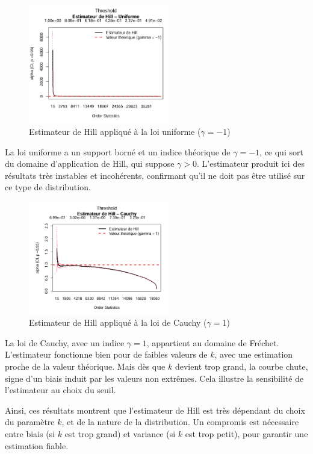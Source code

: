 \documentclass{article}
\theoremstyle{plain}
\theoremstyle{definition}
\theoremstyle{plain}
\begin{document}
\begin{figure}[H]
    \centering
    \includegraphics[width=0.55\textwidth]{./image_hill_pickands/uniforme_hill.png}
    \caption{Estimateur de Hill appliqué à la loi uniforme ($\gamma = -1$)}
\end{figure}
La loi uniforme a un support borné et un indice théorique de \(\gamma = -1\), ce qui sort du domaine d’application de Hill, qui suppose \(\gamma > 0\). L’estimateur produit ici des résultats très instables et incohérents, confirmant qu’il ne doit pas être utilisé sur ce type de distribution.

\begin{figure}[H]
    \centering
    \includegraphics[width=0.55\textwidth]{./image_hill_pickands/cauchy_hill.png}
    \caption{Estimateur de Hill appliqué à la loi de Cauchy ($\gamma = 1$)}
\end{figure}
La loi de Cauchy, avec un indice \(\gamma = 1\), appartient au domaine de Fréchet. L’estimateur fonctionne bien pour de faibles valeurs de \(k\), avec une estimation proche de la valeur théorique. Mais dès que \(k\) devient trop grand, la courbe chute, signe d’un biais induit par les valeurs non extrêmes. Cela illustre la sensibilité de l’estimateur au choix du seuil.

\medskip
\noindent
Ainsi, ces résultats montrent que l’estimateur de Hill est très dépendant du choix du paramètre \(k\), et de la nature de la distribution. Un compromis est nécessaire entre biais (si \(k\) est trop grand) et variance (si \(k\) est trop petit), pour garantir une estimation fiable.
\end{document}
